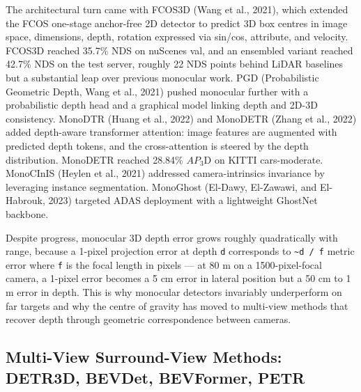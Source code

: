 The architectural turn came with FCOS3D (Wang et al., 2021), which extended the FCOS one-stage anchor-free 2D detector to predict 3D box centres in image space, dimensions, depth, rotation expressed via sin/cos, attribute, and velocity. FCOS3D reached 35.7\% NDS on nuScenes val, and an ensembled variant reached 42.7\% NDS on the test server, roughly 22 NDS points behind LiDAR baselines but a substantial leap over previous monocular work. PGD (Probabilistic Geometric Depth, Wang et al., 2021) pushed monocular further with a probabilistic depth head and a graphical model linking depth and 2D-3D consistency. MonoDTR (Huang et al., 2022) and MonoDETR (Zhang et al., 2022) added depth-aware transformer attention: image features are augmented with predicted depth tokens, and the cross-attention is steered by the depth distribution. MonoDETR reached 28.84\% \(AP_3\)D on KITTI cars-moderate. MonoCInIS (Heylen et al., 2021) addressed camera-intrinsics invariance by leveraging instance segmentation. MonoGhost (El-Dawy, El-Zawawi, and El-Habrouk, 2023) targeted ADAS deployment with a lightweight GhostNet backbone.

Despite progress, monocular 3D depth error grows roughly quadratically with range, because a 1-pixel projection error at depth \texttt{d} corresponds to \texttt{\textasciitilde{}d\ /\ f} metric error where \texttt{f} is the focal length in pixels --- at 80 m on a 1500-pixel-focal camera, a 1-pixel error becomes a 5 cm error in lateral position but a 50 cm to 1 m error in depth. This is why monocular detectors invariably underperform on far targets and why the centre of gravity has moved to multi-view methods that recover depth through geometric correspondence between cameras.

\subsection{Multi-View Surround-View Methods: DETR3D, BEVDet, BEVFormer, PETR}\label{multi-view-surround-view-methods-detr3d-bevdet-bevformer-petr}

